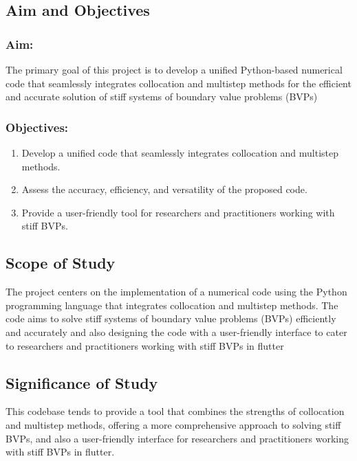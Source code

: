 \documentclass{report}
\begin{document}
\subsection{Aim and Objectives}
\subsubsection{Aim:}
The primary goal of this project is to develop a unified Python-based numerical code that seamlessly integrates collocation and multistep methods for the efficient and accurate solution of stiff systems of boundary value problems (BVPs)
\subsubsection{Objectives:}
\begin{enumerate}
  \item Develop a unified code that seamlessly integrates collocation and multistep methods.
  \item Assess the accuracy, efficiency, and versatility of the proposed code.
  \item Provide a user-friendly tool for researchers and practitioners working with stiff BVPs.
\end{enumerate}

\subsection{Scope of Study}
The project centers on the implementation of a numerical code using the Python programming language that integrates collocation and multistep methods. The code aims to solve stiff systems of boundary value problems (BVPs) efficiently and accurately and also designing the code with a user-friendly interface to cater to researchers and practitioners working with stiff BVPs in flutter

\subsection{Significance of Study}
This codebase tends to provide a tool that combines the strengths of collocation and multistep methods, offering a more comprehensive approach to solving stiff BVPs, and also a user-friendly interface for researchers and practitioners working with stiff BVPs in flutter.
\end{document}
